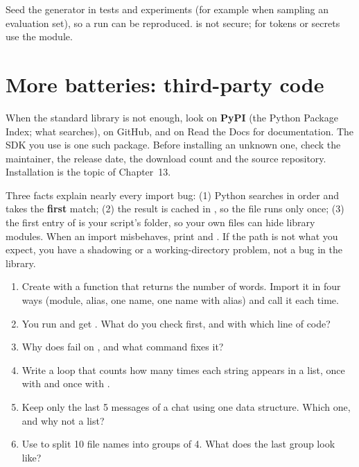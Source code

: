 \begin{gamerule}
Seed the generator in tests and experiments (for example when sampling an evaluation set),
so a run can be reproduced.  is not secure; for tokens or secrets use the
 module.
\end{gamerule}

\section{More batteries: third-party code}

When the standard library is not enough, look on \textbf{PyPI} (the Python Package Index; what
 searches), on GitHub, and on Read the Docs for documentation. The 
SDK you use is one such package. Before installing an unknown one, check the maintainer,
the release date, the download count and the source repository. Installation is the topic of
Chapter~13.

\begin{boss}
Three facts explain nearly every import bug: (1) Python searches  in order and
takes the \textbf{first} match; (2) the result is cached in , so the file runs
only once; (3) the first entry of  is your script's folder, so your own files can
hide library modules. When an import misbehaves, print  and
. If the path is not what you expect, you have a shadowing or a working-directory
problem, not a bug in the library.
\end{boss}

\begin{practice}
\begin{enumerate}[leftmargin=*,itemsep=2pt]
\item Create  with a function  that returns the number of
  words. Import it in four ways (module, alias, one name, one name with alias) and call it each time.
\item You run  and get .
  What do you check first, and with which line of code?
\item Why does  fail on , and what command fixes it?
\item Write a loop that counts how many times each  string appears in a list,
  once with  and once with .
\item Keep only the last 5 messages of a chat using one data structure. Which one, and why not a list?
\item Use  to split 10 file names into groups of 4. What does the last group look like?
\end{enumerate}
\end{practice}

